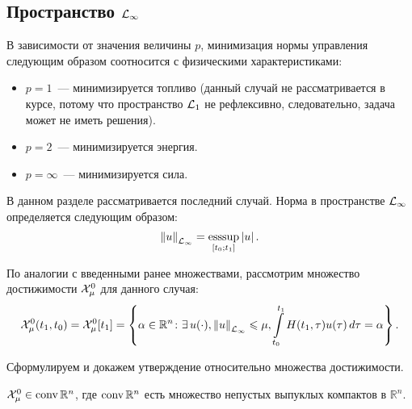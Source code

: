 \subsection{Пространство ${\mathcal{L}_\infty}$}

В зависимости от значения величины $p$, минимизация нормы управления
следующим образом соотносится с физическими характеристиками:
\begin{itemize}
	\item $p = 1$~--- минимизируется топливо (данный случай не рассматривается в курсе,
	потому что пространство ${\mathcal{L}_1}$ не рефлексивно, следовательно, задача может не иметь решения).
	
	\item $p = 2$~--- минимизируется энергия.
	
	\item $p = \infty$~--- минимизируется сила.
\end{itemize}

В данном разделе рассматривается последний случай.
Норма в пространстве ${\mathcal{L}_\infty}$ определяется следующим образом:
\begin{equation*}
	\left\| u \right\|_{\mathcal{L}_\infty} = \operatorname*{esssup}_{[t_0; t_1]} \left| u \right|.
\end{equation*}

По аналогии с введенными ранее множествами, рассмотрим множество достижимости
$\mathcal{X}_\mu^0$ для данного случая:
\begin{equation}
\label{LInf_moment_task_soa}
	\soa_\mu^0 (t_1, t_0) = \soa_\mu^0 [t_1] =
	\left\lbrace
	  \alpha \in \mathbb{R}^n \colon \exists u(\cdot), \norm{u}_{\LInf} \leqslant \mu,	  
	  \int\limits_{t_0}^{t_1} H(t_1, \tau) u(\tau)\,d\tau = \alpha
	\right\rbrace.
\end{equation}

Сформулируем и докажем утверждение относительно множества достижимости.

\begin{stm}
	$\mathcal{X}_\mu^0 \in \operatorname{conv} \mathbb{R}^n$, где $\operatorname{conv} \mathbb{R}^n$ есть множество
	непустых выпуклых компактов в $\mathbb{R}^n$.
\end{stm}


